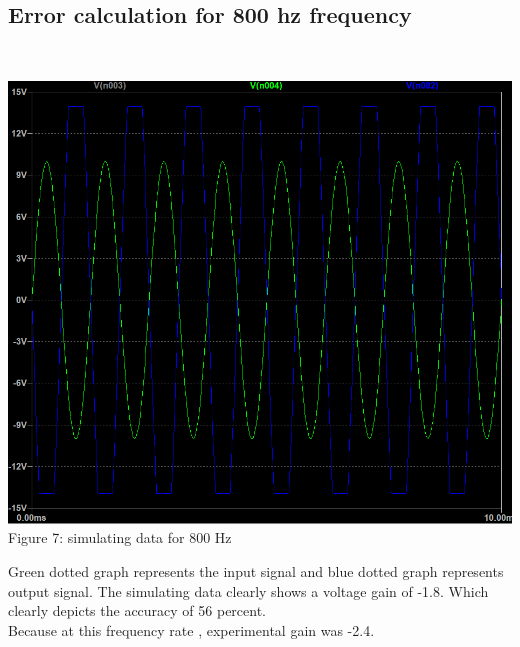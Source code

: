 \documentclass[12pt]{article}
\begin{document}
\subsection{Error calculation for 800 hz frequency}\\
[1cm]
\begin{center}
    \includegraphics[scale=.4]{800hz_lab1.png}\\
    \caption{Figure 7: simulating data for 800 Hz}
\end{center}
Green dotted graph represents the input signal and blue dotted graph represents output signal. The simulating data clearly shows a voltage gain of -1.8. Which clearly depicts the accuracy of 56 percent.\\
Because at this frequency rate , experimental gain was -2.4.\\
\end{document}
